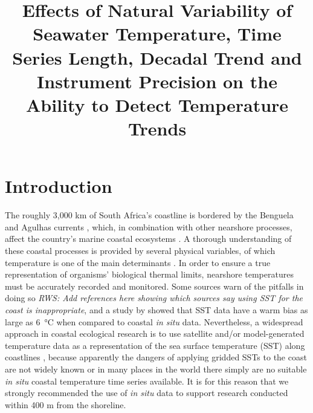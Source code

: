 \documentclass[]{ametsoc}
\title{Effects of Natural Variability of Seawater Temperature, Time Series Length, Decadal Trend and Instrument Precision on the Ability to Detect Temperature Trends}
\affiliation{Department of Biodiversity and Conservation Biology, University of the Western Cape, Bellville, Republic of South Africa}
\begin{document}
\maketitle

\section{Introduction}
The roughly 3,000 km of South Africa's coastline is bordered by the Benguela and Agulhas currents \citep[\emph{e.g.}][]{Roberts2005,Hutchings2009}, which, in combination with other nearshore processes, affect the country's marine coastal ecosystems \citep{Santos2012a}. A thorough understanding of these coastal processes is provided by several physical variables, of which temperature is one of the main determinants \citep[\emph{e.g.}][]{Blanchette2008, Tittensor2010, Couce2012}. In order to ensure a true representation of organisms' biological thermal limits, nearshore temperatures must be accurately recorded and monitored. Some sources warn of the pitfalls in doing so \emph{RWS: Add references here showing which sources say using SST for the coast is inappropriate}, and a study by \citet{Smit2013} showed that SST data have a warm bias as large as \SI{6}{\degreeCelsius} when compared to coastal \emph{in situ} data. Nevertheless, a widespread approach in coastal ecological research is to use satellite and/or model-generated temperature data as a representation of the sea surface temperature (SST) along coastlines \citep[\emph{e.g.}][]{Blanchette2008, Broitman2008a, Tyberghein2012}, because apparently the dangers of applying gridded SSTs to the coast are not widely known or in many places in the world there simply are no suitable \emph{in situ} coastal temperature time series available. It is for this reason that we strongly recommended the use of \emph{in situ} data to support research conducted within 400 m from the shoreline.
\end{document}

